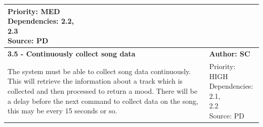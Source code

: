\documentclass[10pt, notitlepage]{report}
\begin{document}
\begin{center}
\begin{longtable}{| p{13cm} | p{3cm} |}
\makecell{Priority: MED\\Dependencies: 2.2,\\ 2.3\\Source: PD}\\
\hline
\textbf{3.5 - Continuously collect song data} & \textbf{Author: SC} \\
\hline
The system must be able to collect song data continuously. This will retrieve the information about a track which is collected and then processed to return a mood. There will be a delay before the next command to collect data on the song, this may be every 15 seconds or so. & 
\makecell{Priority: HIGH\\Dependencies: 2.1,\\2.2\\Source: PD}\\
\hline



\end{longtable}
\end{center}
\end{document}
